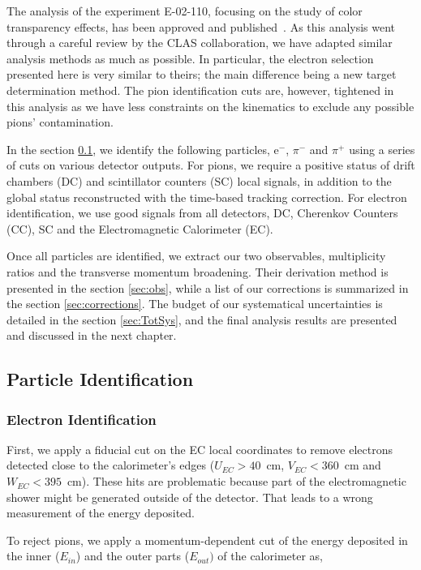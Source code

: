 The analysis of the experiment E-02-110, focusing on the study of color 
transparency effects, has been approved and published~\cite{ElFassi:2008}. As this 
analysis went through a careful review by the CLAS collaboration, we have adapted similar analysis methods as much as possible. In particular, the electron selection 
presented here is very similar to theirs; the main difference being a new 
target determination method. The pion identification cuts are, however, tightened
in this analysis as we have less constraints on the kinematics to exclude any possible pions' contamination.

In the section \ref{sec:pid}, we identify the following particles, e$^-$, 
$\pi^-$ and $\pi^+$ using a series of cuts on various detector outputs. For pions, we require a positive status of drift chambers (DC) and scintillator counters (SC) local signals, in addition to the global status reconstructed with the time-based tracking correction. For electron identification, we use good signals from 
all detectors, DC, Cherenkov Counters (CC), SC and the Electromagnetic 
Calorimeter (EC).

Once all particles are identified, we extract our two observables, multiplicity 
ratios and the transverse momentum broadening. Their derivation method is presented in the section \ref{sec:obs}, while a list of our corrections is summarized in the section \ref{sec:corrections}. The budget of our systematical uncertainties is detailed in the section \ref{sec:TotSys}, and the final analysis results are presented and discussed in the next chapter.

\subsection{Particle Identification}
\label{sec:pid}

\subsubsection{Electron Identification}

First, we apply a fiducial cut on the EC local coordinates to remove electrons detected close to the calorimeter's edges ($U_{EC}>40$~cm, $V_{EC}<360$~cm and 
$W_{EC}<395$~cm). These hits are problematic because part of the electromagnetic shower might be generated outside of the detector. That leads to a wrong measurement of the energy deposited.

To reject pions, we apply a momentum-dependent cut of the energy deposited in the inner ($E_{in}$) and the outer parts ($E_{out})$ of the calorimeter as,

